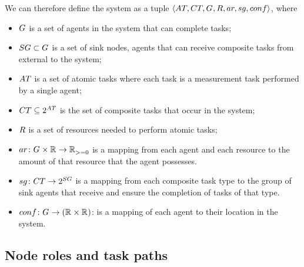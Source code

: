 We can therefore define the system as a tuple $\langle \setAtomicTask{}{}, \setCompositeTask{}{},  \setAgents{}{}, \setResource{}{}, ar, sg, conf \rangle$, where
\begin{itemize}
	\item $G_{}^{}$ is a set of agents in the system that can complete tasks;
	\item $\setSinkAgents{}{} \subset \setAgents{}{}$ is a set of sink nodes, agents that can receive composite tasks from external to the system;
	\item $\setAtomicTask{}{}$ is a set of atomic tasks where each task is a measurement task performed by a single agent;
	\item $\setCompositeTask{}{} \subseteq \powerSetSymbol{\setAtomicTask{}{}}{}{}$ is the set of composite tasks that occur in the system;
	\item $\setResource{}{}$ is a set of resources needed to perform atomic tasks;
	  \item $\formalAgentResources{}{}$ is a mapping from each agent and each resource to the amount of that resource that the agent possesses.
	\item $\formalSinkMapping{}{}$ is a mapping from each composite task type to the group of sink agents that receive and ensure the completion of tasks of that type.
	\item $\formalDeployment{}{}$: is a mapping of each agent to their location in the system.
\end{itemize}

\subsection{Node roles and task paths}
\newcommand{\formalSinkRole}[2]{
	\functionFormal{sink}
	{\setAtomicTask{}{}}
	{\setAgents{}{}}
}
\newcommand{\formalSenseRole}[2]{
	\functionFormal{sensor}
	{\setAtomicTask{}{}}
	{\setAgents{}{}}
}
\newcommand{\formalActiveRole}[2]{
	\functionFormal{active}
	{\setAtomicTask{}{}}
	{\powerSetAgents{}{}}
}
\newcommand{\formalIdleRole}[2]{
	\functionFormal{idle_{\setTime{}{}}}
	{\setAtomicTask{}{}}
	{\powerSetAgents{}{}}
}
\newcommand{\formalSleepRole}[2]{
	\functionFormal{sleep_{\setTime{}{}}}
	{\setAtomicTask{}{}}
	{\powerSetAgents{}{}}
}
\newcommand{\functionSinkRole}[2]{\functionSignature{sink}{\varAtomicTask{}{}}}
	
\newcommand{\functionSenseRole}[2]{\functionSignature{sensor}{\varAtomicTask{}{}}}
\newcommand{\functionActiveRole}[2]{\functionSignature{active_{#1}}{\varAtomicTask{}{}}}
\newcommand{\functionIdleRole}[2]{\functionSignature{idle}{\varAtomicTask{}{}}}
\newcommand{\functionSleepRole}[2]{\functionSignature{sleep}{\varAtomicTask{}{}}}

